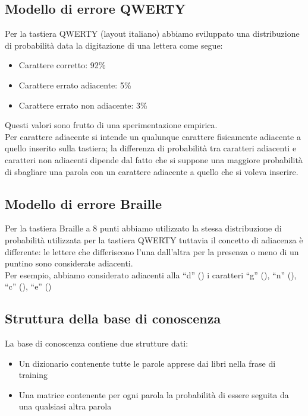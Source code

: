 \documentclass[a4paper,11pt]{article}
\begin{document}
	\subsection{Modello di errore QWERTY}
    	Per la tastiera QWERTY (layout italiano) abbiamo sviluppato una distribuzione di probabilità data la digitazione di una lettera
        come segue:
        \begin{itemize}
        	\item Carattere corretto: 92\%
            \item Carattere errato adiacente: 5\%
            \item Carattere errato non adiacente: 3\%
		\end{itemize}
        Questi valori sono frutto di una sperimentazione empirica.\\
       Per carattere adiacente si intende un qualunque carattere fisicamente adiacente a quello inserito sulla tastiera; la differenza di probabilità
       tra caratteri adiacenti e caratteri non adiacenti dipende dal fatto che si suppone una maggiore probabilità di sbagliare una parola con un
       carattere adiacente a quello che si voleva inserire.
	\subsection{Modello di errore Braille}
    	Per la tastiera Braille a 8 punti abbiamo utilizzato la stessa distribuzione di probabilità utilizzata per la tastiera QWERTY tuttavia
        il concetto di adiacenza è differente:
        le lettere che differiscono l’una dall’altra per la presenza o meno di un 
		puntino sono considerate adiacenti.\\ 
        Per esempio, abbiamo considerato adiacenti alla “d” () i caratteri “g” (), “n” (),  “c” (), “e” 
		() 
        
	\subsection{Struttura della base di conoscenza}
    	La base di conoscenza contiene due strutture dati:
        \begin{itemize}
        	\item Un dizionario contenente tutte le parole apprese dai libri nella frase di training
            \item Una matrice contenente per ogni parola la probabilità di essere seguita da una qualsiasi altra parola
        \end{itemize}
\end{document}
